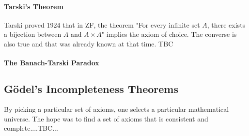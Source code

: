 

\paragraph{Tarski's Theorem}
Tarski proved 1924 that in ZF, the theorem "For every infinite set $A$, there exists a bijection between $A$ and $A \times A$" implies the axiom of choice. The converse is also true and that was already known at that time.  TBC



\paragraph{The Banach-Tarski Paradox}



\subsection{Gödel's Incompleteness Theorems}
By picking a particular set of axioms, one selects a particular mathematical universe. The hope was to find a set of axioms that is consistent and complete....TBC...






